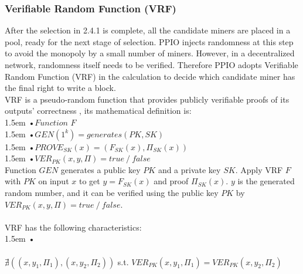 \documentclass[10pt,a4paper]{article}
\begin{document}
                   
        \subsubsection{Verifiable Random Function (VRF)}  %
 \noindent 
After the selection in 2.4.1 is complete, all the candidate miners are placed in a pool, ready for the next stage of selection. PPIO injects randomness at this step to avoid the monopoly by a small number of miners. However, in a decentralized network, randomness itself needs to be verified. Therefore PPIO adopts Verifiable Random Function (VRF) \cite{article20} in the calculation to decide which candidate miner has the final right to write a block.
\vspace{-0.5em}
\\

\noindent  
VRF is a pseudo-random function that provides publicly verifiable proofs of its outputs' correctness \cite{article24}, 
 its mathematical definition \cite{article25} is:
 \vspace{-0.8em}
\\

\hangindent 1.5em
\noindent   
•\quad $Function$ $F$
\\
\hangindent 1.5em
\noindent   
•\quad $GEN\left(1^k\right)=generates\left(PK, SK\right)$
\\
\hangindent 1.5em
\noindent   
•\quad$PROVE_{SK}(x)=(F_{SK}(x), \Pi_{SK}(x))$
\\
\hangindent 1.5em
\noindent   
•\quad $VER_{PK}(x, y, \Pi)= true \mathbin{/} false$
\vspace{-0.5em}
\\

\noindent   
Function $GEN$ generates a public key $PK$ and a private key $SK$. Apply VRF $F$ with $PK$ on input $x$ to get $y=F_{SK}(x)$ and proof $\Pi_{SK}(x)$. $y$ is the generated random number, and it can be verified using the public key $PK$ by $VER_{PK}(x, y, \Pi)= true \mathbin{/} false$.
\vspace{-0.5em}
\\ \\VRF has the following characteristics:
\vspace{-0.8em}
\\

\hangindent 1.5em
\noindent   
•
\vspace{-0.8em}
\\ \\$\nexists((x, y_{1}, \Pi_{1}), (x, y_{2}, \Pi_{2}))$ s.t. $VER_{PK}(x, y_{1}, \Pi_{1})=VER_{PK}(x, y_{2}, \Pi_{2})$
\vspace{-0.8em}
\\
\end{document}

